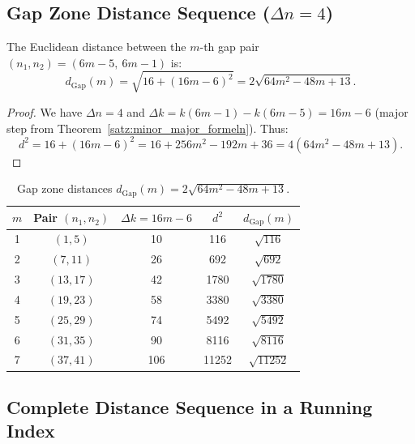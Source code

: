 \subsection{Gap Zone Distance Sequence (\texorpdfstring{$\Delta n = 4$}{Δn=4})}

\begin{satz}
\label{satz:gap_distanz}
The Euclidean distance between the $m$-th gap pair
$(n_1, n_2) = (6m-5,\ 6m-1)$ is:
\begin{equation}
  \boxed{
  d_{\mathrm{Gap}}(m)
  = \sqrt{16 + (16m-6)^2}
  = 2\sqrt{64m^2 - 48m + 13}.
  }
\end{equation}
\end{satz}

\begin{proof}
We have $\Delta n = 4$ and $\Delta k = k(6m-1)-k(6m-5) = 16m-6$
(major step from Theorem~\ref{satz:minor_major_formeln}). Thus:
\[
  d^2 = 16 + (16m-6)^2
      = 16 + 256m^2-192m+36
      = 4(64m^2-48m+13).
\]
\end{proof}

\begin{table}[H]
\centering
\caption{Gap zone distances $d_{\mathrm{Gap}}(m) = 2\sqrt{64m^2-48m+13}$.}
\renewcommand{\arraystretch}{1.15}
\begin{tabular}{ccccc}
\toprule
$m$ & Pair $(n_1, n_2)$ & $\Delta k = 16m-6$ & $d^2$ & $d_{\mathrm{Gap}}(m)$ \\
\midrule
1 & $( 1,  5)$ & 10 &   116 & $\sqrt{116}$  \\
2 & $( 7, 11)$ & 26 &   692 & $\sqrt{692}$  \\
3 & $(13, 17)$ & 42 &  1780 & $\sqrt{1780}$ \\
4 & $(19, 23)$ & 58 &  3380 & $\sqrt{3380}$ \\
5 & $(25, 29)$ & 74 &  5492 & $\sqrt{5492}$ \\
6 & $(31, 35)$ & 90 &  8116 & $\sqrt{8116}$ \\
7 & $(37, 41)$ & 106 & 11252 & $\sqrt{11252}$ \\
\bottomrule
\end{tabular}
\end{table}

\subsection{Complete Distance Sequence in a Running Index}


